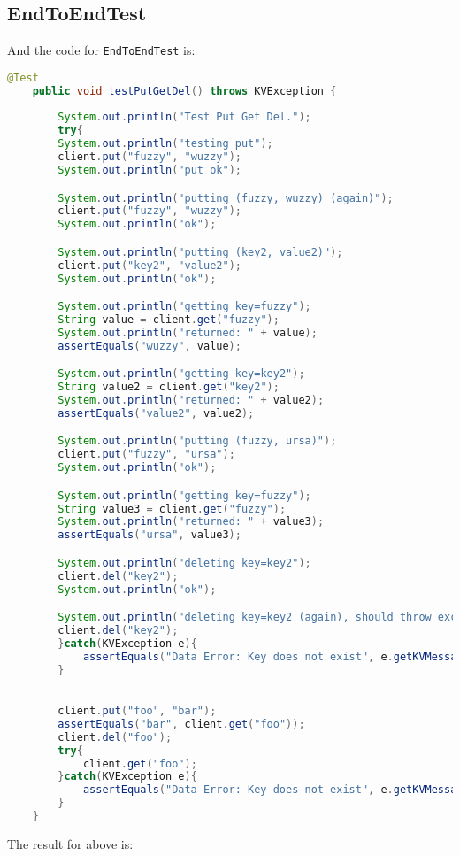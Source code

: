 \documentclass{article}
\begin{document}
\subsection{EndToEndTest}
And the code for \texttt{EndToEndTest} is:
\begin{lstlisting}[language=java]
    @Test
    public void testPutGetDel() throws KVException {
    	
    	System.out.println("Test Put Get Del.");
    	try{
    	System.out.println("testing put");
		client.put("fuzzy", "wuzzy");
		System.out.println("put ok");

		System.out.println("putting (fuzzy, wuzzy) (again)");
		client.put("fuzzy", "wuzzy");
		System.out.println("ok");

		System.out.println("putting (key2, value2)");
		client.put("key2", "value2");
		System.out.println("ok");

		System.out.println("getting key=fuzzy");			
		String value = client.get("fuzzy");					
		System.out.println("returned: " + value);
		assertEquals("wuzzy", value);

		System.out.println("getting key=key2");			
		String value2 = client.get("key2");					
		System.out.println("returned: " + value2);
		assertEquals("value2", value2);

		System.out.println("putting (fuzzy, ursa)");
		client.put("fuzzy", "ursa");
		System.out.println("ok");

		System.out.println("getting key=fuzzy");			
		String value3 = client.get("fuzzy");					
		System.out.println("returned: " + value3);
		assertEquals("ursa", value3);

		System.out.println("deleting key=key2");			
		client.del("key2");					
		System.out.println("ok");

		System.out.println("deleting key=key2 (again), should throw exception");			
		client.del("key2");		
    	}catch(KVException e){
    		assertEquals("Data Error: Key does not exist", e.getKVMessage().getMessage());
    	}

    	
        client.put("foo", "bar");
        assertEquals("bar", client.get("foo"));
		client.del("foo");
		try{
			client.get("foo");
		}catch(KVException e){
			assertEquals("Data Error: Key does not exist", e.getKVMessage().getMessage());
		}
    }
\end{lstlisting}
The result for above is:
\end{document}
